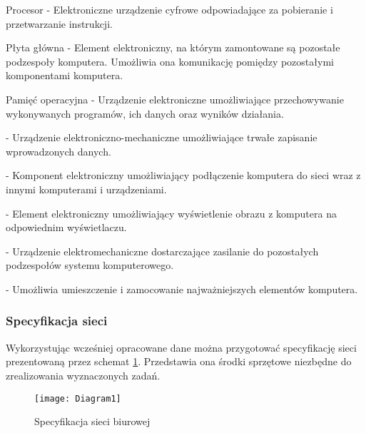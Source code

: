 				\begin{description}
						\item{Procesor} - Elektroniczne urządzenie cyfrowe odpowiadające za pobieranie i przetwarzanie instrukcji. 
			
						\item{Płyta główna} - Element elektroniczny, na którym zamontowane są pozostałe podzespoły komputera. Umożliwia ona komunikację pomiędzy pozostałymi komponentami komputera.
			
						\item{Pamięć operacyjna} - Urządzenie elektroniczne umożliwiające przechowywanie wykonywanych programów, ich danych oraz wyników działania.
			
						\item[Dysk twardy] - Urządzenie elektroniczno-mechaniczne umożliwiające trwałe zapisanie wprowadzonych danych.
			
						\item[Karta sieciowa] - Komponent elektroniczny umożliwiający podłączenie komputera do sieci wraz z innymi komputerami i urządzeniami.
			
						\item[Karta graficzna] - Element elektroniczny umożliwiający wyświetlenie obrazu z komputera na odpowiednim wyświetlaczu.
			
						\item[Zasilacz] - Urządzenie elektromechaniczne dostarczające zasilanie do pozostałych podzespołów systemu komputerowego.
			
						\item[Obudowa] - Umożliwia umieszczenie i zamocowanie najważniejszych elementów komputera.
				\end{description}
				
				\subsubsection{Specyfikacja sieci}
					\par Wykorzystując wcześniej opracowane dane można przygotować specyfikację sieci prezentowaną przez schemat \ref{office}. Przedstawia ona środki sprzętowe niezbędne do zrealizowania wyznaczonych zadań.
			
					\begin{figure}[H]
						\centering
						\texttt{[image: Diagram1]}
						\caption{Specyfikacja sieci biurowej}
						\label{office}
					\end{figure}
				
